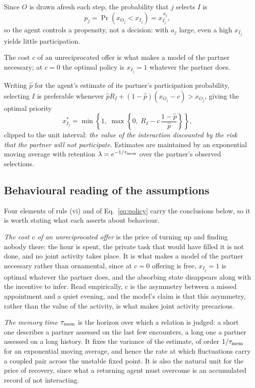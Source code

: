 \documentclass[aps,pre,twocolumn,superscriptaddress,floatfix,longbibliography]{revtex4-2}
\begin{document}
Since $O$ is drawn afresh each step, the probability that $j$ selects $I$ is
\begin{equation}
  p_j = \Pr\!\left(x_{O_j} < x_{I_j}\right) = x_{I_j}^{\,a_j},
  \label{eq:reachprob}
\end{equation}
so the agent controls a propensity, not a decision: with $a_j$ large, even a
high $x_{I_j}$ yields little participation.

The cost $c$ of an unreciprocated offer is what makes a model of the partner
necessary; at $c=0$ the optimal policy is $x_{I_j}=1$ whatever the partner does.

Writing $\hat p$ for the agent's estimate of its partner's participation
probability, selecting $I$ is preferable whenever
$\hat p R_I + (1-\hat p)(x_{O_j}-c) > x_{O_j}$, giving the optimal priority
\begin{equation}
  x_{I_j}^{*} = \min\!\left\{1,\;\max\!\left\{0,\;
              R_I - c\,\frac{1-\hat p}{\hat p}\right\}\right\},
  \label{eq:policy}
\end{equation}
clipped to the unit interval: \emph{the value of the interaction discounted by
the risk that the partner will not participate}.
Estimates are maintained by an exponential moving average with retention
$\lambda=e^{-1/\tau_{\rm mem}}$ over the partner's observed selections.

\subsection[Behavioural reading of the assumptions]{Behavioural reading of the assumptions}
\label{sec:behavioural}

Four elements of rule (vi) and of Eq.~\eqref{eq:policy} carry the
conclusions below, so it is worth stating what each asserts about behaviour.

\emph{The cost $c$ of an unreciprocated offer} is the price of turning up
and finding nobody there: the hour is spent, the private task that would have
filled it is not done, and no joint activity takes place. It is what makes a
model of the partner necessary rather than ornamental, since at $c=0$ offering is
free, $x_{I_j}=1$ is optimal whatever the partner does, and the absorbing state
disappears along with the incentive to infer. Read empirically, $c$ is the
asymmetry between a missed appointment and a quiet evening, and the model's claim
is that this asymmetry, rather than the value of the activity, is what makes
joint activity precarious.

\emph{The memory time $\tau_{\rm mem}$} is the horizon over which a
relation is judged: a short one describes a partner assessed on the last few
encounters, a long one a partner assessed on a long history. It fixes the
variance of the estimate, of order $1/\tau_{\rm mem}$ for an exponential moving
average, and hence the rate at which fluctuations carry a coupled pair across
the unstable fixed point. It is also the natural unit for the price of recovery,
since what a returning agent must overcome is an accumulated record of not
interacting.
\end{document}
